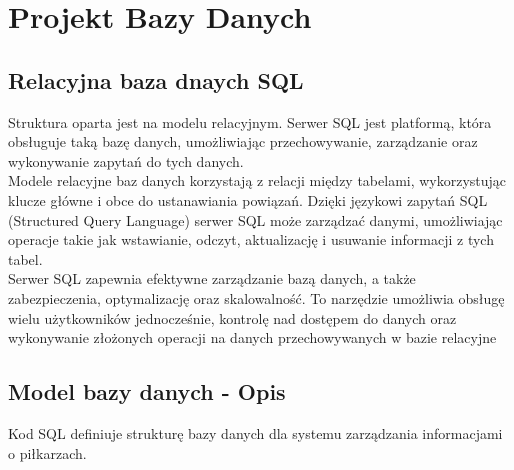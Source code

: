 \section{Projekt Bazy Danych}
    \subsection{Relacyjna baza dnaych SQL}
        Struktura oparta jest na modelu relacyjnym. Serwer SQL jest platformą, która obsługuje taką bazę danych, umożliwiając przechowywanie, zarządzanie oraz wykonywanie zapytań do tych danych.\\

        Modele relacyjne baz danych korzystają z relacji między tabelami, wykorzystując klucze główne i obce do ustanawiania powiązań. Dzięki językowi zapytań SQL (Structured Query Language) serwer SQL może zarządzać danymi, umożliwiając operacje takie jak wstawianie, odczyt, aktualizację i usuwanie informacji z tych tabel.\\
        
        Serwer SQL zapewnia efektywne zarządzanie bazą danych, a także zabezpieczenia, optymalizację oraz skalowalność. To narzędzie umożliwia obsługę wielu użytkowników jednocześnie, kontrolę nad dostępem do danych oraz wykonywanie złożonych operacji na danych przechowywanych w bazie relacyjne

    \subsection{Model bazy danych - Opis}
          

            Kod SQL definiuje strukturę bazy danych dla systemu zarządzania informacjami o piłkarzach.

